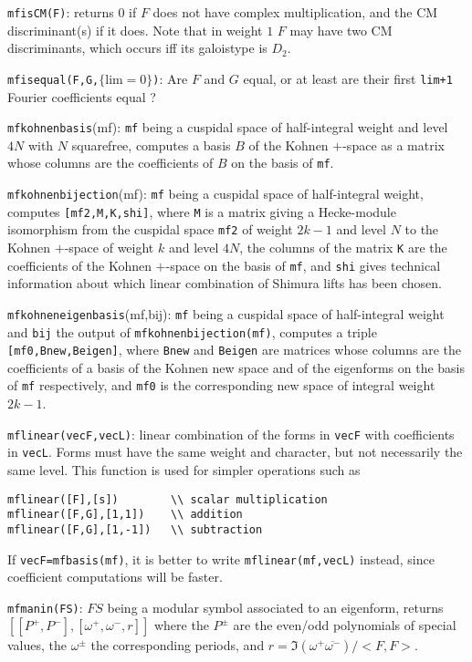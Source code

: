 \documentclass[11pt]{article}
\def\kbd#1{{\tt #1}}
\begin{document}
\f\kbd{mfisCM(F)}: returns $0$ if $F$ does not have complex multiplication,
and the CM discriminant(s) if it does. Note that in weight $1$ $F$ may have
two CM discriminants, which occurs iff its galoistype is $D_2$.

\f\kbd{mfisequal(F,G,$\{\text{lim}=0\}$)}: Are $F$ and $G$ equal, or at least
are their first \kbd{lim+1} Fourier coefficients equal ?

\f\kbd{mfkohnenbasis}(mf): \kbd{mf} being a cuspidal space of half-integral
weight and level $4N$ with $N$ squarefree, computes a basis $B$ of the Kohnen
$+$-space as a matrix whose columns are the coefficients of $B$ on the basis
of \kbd{mf}.

\f\kbd{mfkohnenbijection}(mf): \kbd{mf} being a cuspidal space of
half-integral weight, computes \kbd{[mf2,M,K,shi]}, where \kbd{M} is a matrix
giving a Hecke-module isomorphism from the cuspidal space \kbd{mf2} of weight
$2k-1$ and level $N$ to the Kohnen $+$-space of weight $k$ and level $4N$,
the columns of the matrix \kbd{K} are the coefficients of the Kohnen $+$-space
on the basis of \kbd{mf}, and \kbd{shi} gives technical information about
which linear combination of Shimura lifts has been chosen.

\f\kbd{mfkohneneigenbasis}(mf,bij): \kbd{mf} being a cuspidal space of
half-integral weight and \kbd{bij} the output of \kbd{mfkohnenbijection(mf)},
computes a triple \kbd{[mf0,Bnew,Beigen]}, where \kbd{Bnew} and \kbd{Beigen}
are matrices whose columns are the coefficients of a basis of the Kohnen
new space and of the eigenforms on the basis of \kbd{mf} respectively, and
\kbd{mf0} is the corresponding new space of integral weight $2k-1$.

\f\kbd{mflinear(vecF,vecL)}: linear combination of the forms in \kbd{vecF}
with coefficients in \kbd{vecL}. Forms must have the same weight and
character, but not necessarily the same level. This function is used
for simpler operations such as
\begin{verbatim}
mflinear([F],[s])        \\ scalar multiplication
mflinear([F,G],[1,1])    \\ addition
mflinear([F,G],[1,-1])   \\ subtraction
\end{verbatim}
If \kbd{vecF=mfbasis(mf)}, it is better to write \kbd{mflinear(mf,vecL)}
instead, since coefficient computations will be faster.

\f\kbd{mfmanin(FS)}: $FS$ being a modular symbol associated to an eigenform,
returns $[[P^+,P^-],[\omega^+,\omega^-,r]]$ where the $P^{\pm}$ are the
even/odd polynomials of special values, the $\omega^{\pm}$ the
corresponding periods, and $r=\Im(\omega^+\overline{\omega^-})/<F,F>$.
\end{document}
